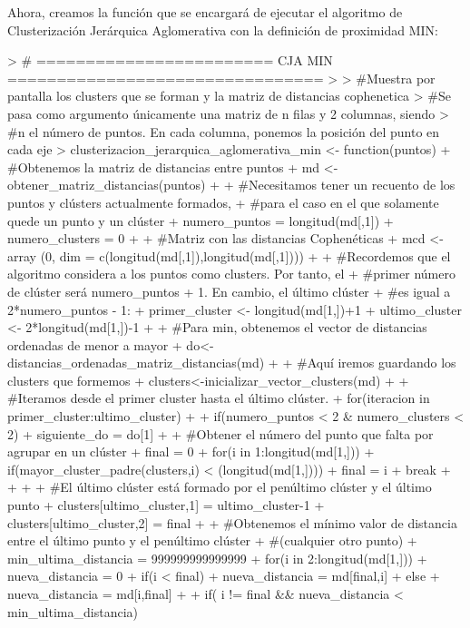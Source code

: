 \documentclass[parskip=full]{scrartcl}
\begin{document}
Ahora, creamos la función que se encargará de ejecutar el algoritmo de Clusterización Jerárquica Aglomerativa con la definición de proximidad MIN:


\begin{Schunk}
\begin{Sinput}
> # ======================== CJA MIN ================================
> 
> #Muestra por pantalla los clusters que se forman y la matriz de distancias cophenetica
> #Se pasa como argumento únicamente una matriz de n filas y 2 columnas, siendo
> #n el número de puntos. En cada columna, ponemos la posición del punto en cada eje
> clusterizacion_jerarquica_aglomerativa_min <- function(puntos) {
+ #Obtenemos la matriz de distancias entre puntos
+ md <- obtener_matriz_distancias(puntos)
+ 
+ #Necesitamos tener un recuento de los puntos y clústers actualmente formados, 
+ #para el caso en el que solamente quede un punto y un clúster
+ numero_puntos = longitud(md[,1])
+ numero_clusters = 0
+ 
+ #Matriz con las distancias Cophenéticas
+ mcd <- array (0, dim = c(longitud(md[,1]),longitud(md[,1])))
+ 
+ #Recordemos que el algoritmo considera a los puntos como clusters. Por tanto, el 
+ #primer número de clúster será numero_puntos + 1. En cambio, el último clúster
+ #es igual a 2*numero_puntos - 1:
+ primer_cluster <- longitud(md[1,])+1
+ ultimo_cluster <- 2*longitud(md[1,])-1
+ 
+ #Para min, obtenemos el vector de distancias ordenadas de menor a mayor
+ do<-distancias_ordenadas_matriz_distancias(md)
+ 
+ #Aquí iremos guardando los clusters que formemos
+ clusters<-inicializar_vector_clusters(md)
+ 
+ #Iteramos desde el primer cluster hasta el último clúster.
+ for(iteracion in primer_cluster:ultimo_cluster){
+ 
+ if(numero_puntos < 2 & numero_clusters < 2){
+   siguiente_do = do[1]
+   
+   #Obtener el número del punto que falta por agrupar en un clúster
+   final = 0
+   for(i in 1:longitud(md[1,])){
+     if(mayor_cluster_padre(clusters,i) < (longitud(md[1,]))){
+       final = i
+       break
+     }
+   }
+   
+   #El último clúster está formado por el penúltimo clúster y el último punto
+   clusters[ultimo_cluster,1] = ultimo_cluster-1
+   clusters[ultimo_cluster,2] = final
+   
+   #Obtenemos el mínimo valor de distancia entre el último punto y el penúltimo clúster 
+   #(cualquier otro punto)
+   min_ultima_distancia = 999999999999999
+   for(i in 2:longitud(md[1,])){
+     nueva_distancia = 0
+     if(i < final){
+       nueva_distancia = md[final,i]
+     } else {
+       nueva_distancia = md[i,final]
+     }
+     if( i != final && nueva_distancia < min_ultima_distancia)
}}}}
\end{Sinput}
\end{Schunk}
\end{document}
